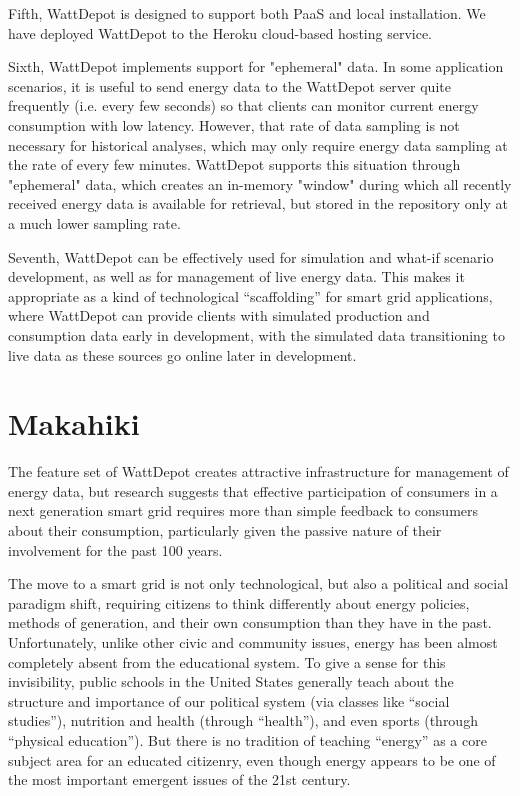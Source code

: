 \documentclass{acm_proc_article-sp}
\begin{document}
Fifth, WattDepot is designed to support both PaaS and local installation. We have deployed
WattDepot to the Heroku cloud-based hosting service.

Sixth, WattDepot implements support for "ephemeral" data. In some application scenarios,
it is useful to send energy data to the WattDepot server quite frequently (i.e. every few
seconds) so that clients can monitor current energy consumption with low latency. However,
that rate of data sampling is not necessary for historical analyses, which may only
require energy data sampling at the rate of every few minutes. WattDepot supports this
situation through "ephemeral" data, which creates an in-memory "window" during which all
recently received energy data is available for retrieval, but stored in the repository
only at a much lower sampling rate.

Seventh, WattDepot can be effectively used for simulation and what-if scenario
development, as well as for management of live energy data.  This makes it appropriate as
a kind of technological ``scaffolding'' for smart grid applications, where WattDepot can
provide clients with simulated production and consumption data early in development, with
the simulated data transitioning to live data as these sources go online later in development.

\section{Makahiki}

The feature set of WattDepot creates attractive infrastructure for management of energy
data, but research suggests that effective participation of consumers in a next generation
smart grid requires more than simple feedback to consumers about their consumption,
particularly given the passive nature of their involvement for the past 100 years. 

The move to a smart grid is not only technological, but also a political and social
paradigm shift, requiring citizens to think differently about energy policies, methods of
generation, and their own consumption than they have in the past. Unfortunately, unlike
other civic and community issues, energy has been almost completely absent from the
educational system. To give a sense for this invisibility, public schools in the United
States generally teach about the structure and importance of our political system (via
classes like ``social studies''), nutrition and health (through ``health''), and even sports
(through ``physical education''). But there is no tradition of teaching ``energy'' as a core
subject area for an educated citizenry, even though energy appears to be one of the most
important emergent issues of the 21st century.
\end{document}
